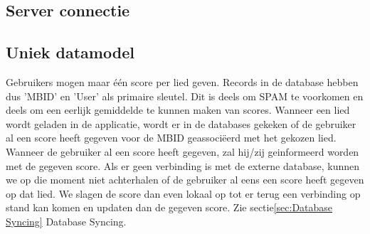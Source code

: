 \documentclass[11pt,a4paper]{article}
\begin{document}
	\subsection{Server connectie}
	\label{sec:serverconnection}

	\subsection{Uniek datamodel}
	\label{sec:Uniek datamodel}
	Gebruikers mogen maar één score per lied geven. Records in de database hebben dus 'MBID' en 'User' als primaire sleutel. Dit is deels om SPAM te voorkomen en deels om een eerlijk gemiddelde te kunnen maken van scores. Wanneer een lied wordt geladen in de applicatie, wordt er in de databases gekeken of de gebruiker al een score heeft gegeven voor de MBID geassociëerd met het gekozen lied. Wanneer de gebruiker al een score heeft gegeven, zal hij/zij geinformeerd worden met de gegeven score. 
	Als er geen verbinding is met de externe database, kunnen we op die moment niet achterhalen of de gebruiker al eens een score heeft gegeven op dat lied. We slagen de score dan even lokaal op tot er terug een verbinding op stand kan komen en updaten dan de gegeven score. Zie sectie\ref{sec:Database Syncing} Database Syncing.
	
\end{document}
